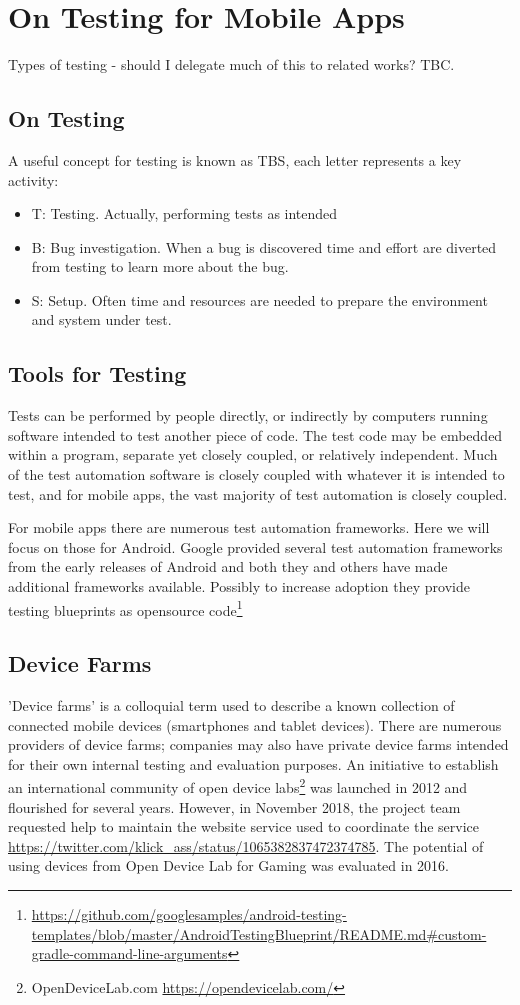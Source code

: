 \section{On Testing for Mobile Apps}
Types of testing - should I delegate much of this to related works? TBC.

\subsection{On Testing}
A useful concept for testing is known as TBS, each letter represents a key activity:
\begin{itemize}
    \item T: Testing. Actually, performing tests as intended
    \item B: Bug investigation. When a bug is discovered time and effort are diverted from testing to learn more about the bug.
    \item S: Setup. Often time and resources are needed to prepare the environment and system under test. 
\end{itemize}

\subsection{Tools for Testing}
Tests can be performed by people directly, or indirectly by computers running software intended to test another piece of code. The test code may be embedded within a program, separate yet closely coupled, or relatively independent. Much of the test automation software is closely coupled with whatever it is intended to test, and for mobile apps, the vast majority of test automation is closely coupled.

For mobile apps there are numerous test automation frameworks. Here we will focus on those for Android. Google provided several test automation frameworks from the early releases of Android and both they and others have made additional frameworks available. Possibly to increase adoption they provide testing blueprints as opensource code\footnote{\url{https://github.com/googlesamples/android-testing-templates/blob/master/AndroidTestingBlueprint/README.md\#custom-gradle-command-line-arguments}}

\subsection{Device Farms}
'Device farms' is a colloquial term used to describe a known collection of connected mobile devices (smartphones and tablet devices). There are numerous providers of device farms; companies may also have private device farms intended for their own internal testing and evaluation purposes. An initiative to establish an international community of open device labs\footnote{OpenDeviceLab.com \url{https://opendevicelab.com/}} was launched in 2012 and flourished for several years. However, in November 2018, the project team requested help to maintain the website service used to coordinate the service \url{https://twitter.com/klick_ass/status/1065382837472374785}. The potential of using devices from Open Device Lab for Gaming was evaluated in 2016\cite{godinho2016open}.

